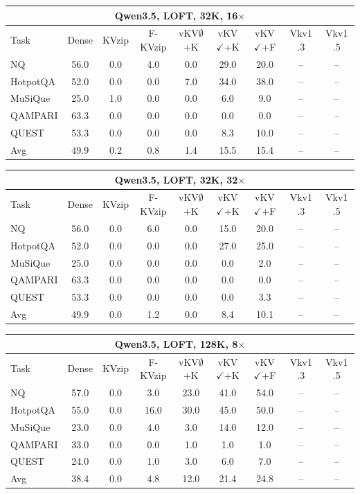 \begin{tabular}{lcccccccc}
\toprule
\multicolumn{9}{c}{Qwen3.5, LOFT, 32K, 16$\times$} \\
\midrule
Task & Dense & KVzip & F-KVzip & vKV$\emptyset$+K & vKV$\checkmark$+K & vKV$\checkmark$+F & Vkv1 .3 & Vkv1 .5 \\
\midrule
NQ & 56.0 & 0.0 & 4.0 & 0.0 & 29.0 & 20.0 & -- & -- \\
HotpotQA & 52.0 & 0.0 & 0.0 & 7.0 & 34.0 & 38.0 & -- & -- \\
MuSiQue & 25.0 & 1.0 & 0.0 & 0.0 & 6.0 & 9.0 & -- & -- \\
QAMPARI & 63.3 & 0.0 & 0.0 & 0.0 & 0.0 & 0.0 & -- & -- \\
QUEST & 53.3 & 0.0 & 0.0 & 0.0 & 8.3 & 10.0 & -- & -- \\
\midrule
Avg & 49.9 & 0.2 & 0.8 & 1.4 & 15.5 & 15.4 & -- & -- \\
\bottomrule
\end{tabular}
\vspace{0.8em}

\begin{tabular}{lcccccccc}
\toprule
\multicolumn{9}{c}{Qwen3.5, LOFT, 32K, 32$\times$} \\
\midrule
Task & Dense & KVzip & F-KVzip & vKV$\emptyset$+K & vKV$\checkmark$+K & vKV$\checkmark$+F & Vkv1 .3 & Vkv1 .5 \\
\midrule
NQ & 56.0 & 0.0 & 6.0 & 0.0 & 15.0 & 20.0 & -- & -- \\
HotpotQA & 52.0 & 0.0 & 0.0 & 0.0 & 27.0 & 25.0 & -- & -- \\
MuSiQue & 25.0 & 0.0 & 0.0 & 0.0 & 0.0 & 2.0 & -- & -- \\
QAMPARI & 63.3 & 0.0 & 0.0 & 0.0 & 0.0 & 0.0 & -- & -- \\
QUEST & 53.3 & 0.0 & 0.0 & 0.0 & 0.0 & 3.3 & -- & -- \\
\midrule
Avg & 49.9 & 0.0 & 1.2 & 0.0 & 8.4 & 10.1 & -- & -- \\
\bottomrule
\end{tabular}
\vspace{0.8em}

\begin{tabular}{lcccccccc}
\toprule
\multicolumn{9}{c}{Qwen3.5, LOFT, 128K, 8$\times$} \\
\midrule
Task & Dense & KVzip & F-KVzip & vKV$\emptyset$+K & vKV$\checkmark$+K & vKV$\checkmark$+F & Vkv1 .3 & Vkv1 .5 \\
\midrule
NQ & 57.0 & 0.0 & 3.0 & 23.0 & 41.0 & 54.0 & -- & -- \\
HotpotQA & 55.0 & 0.0 & 16.0 & 30.0 & 45.0 & 50.0 & -- & -- \\
MuSiQue & 23.0 & 0.0 & 4.0 & 3.0 & 14.0 & 12.0 & -- & -- \\
QAMPARI & 33.0 & 0.0 & 0.0 & 1.0 & 1.0 & 1.0 & -- & -- \\
QUEST & 24.0 & 0.0 & 1.0 & 3.0 & 6.0 & 7.0 & -- & -- \\
\midrule
Avg & 38.4 & 0.0 & 4.8 & 12.0 & 21.4 & 24.8 & -- & -- \\
\bottomrule
\end{tabular}
\vspace{0.8em}

